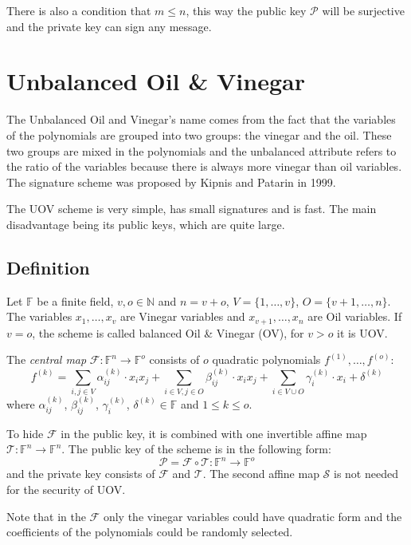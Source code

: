 \documentclass[thesis=M,english]{FITthesis}[2019/12/23]
\begin{document}
There is also a condition that $m \leq n$, this way the public key $\mathcal{P}$ will be surjective and the private key can sign any message.

\section{Unbalanced Oil \& Vinegar}
The Unbalanced Oil and Vinegar's name comes from the fact that the variables of the polynomials are grouped into two groups: the vinegar and the oil. These two groups are mixed in the polynomials and the unbalanced attribute refers to the ratio of the variables because there is always more vinegar than oil variables. The signature scheme was proposed by Kipnis and Patarin in 1999.

\bigskip
\noindent
The UOV scheme is very simple, has small signatures and is fast. The main disadvantage being its public keys, which are quite large.

\subsection{Definition}
Let $\mathbb{F}$ be a finite field, $v,o \in \mathbb{N}$ and $n=v+o$, $V=\{1, \ldots, v\}$, $O=\{v+1, \ldots, n\}$. The variables $x_1, \ldots, x_v$ are Vinegar variables and $x_{v+1}, \ldots, x_n$ are Oil variables. If $v=o$, the scheme is called balanced Oil \& Vinegar (OV), for $v>o$ it is UOV.

\bigskip
\noindent
The \textit{central map} $\mathcal{F}:\mathbb{F}^n \rightarrow \mathbb{F}^o$ consists of $o$ quadratic polynomials $f^{(1)}, \ldots, f^{(o)}$:
\[
f^{(k)} = \sum\limits_{i,j \in V}{\alpha_{ij}^{(k)} \cdot x_ix_j} + \sum\limits_{i \in V,j \in O}{\beta_{ij}^{(k)} \cdot x_ix_j}+ \sum\limits_{i \in V \cup O}{\gamma_{i}^{(k)} \cdot x_i} + \delta^{(k)}
\]
where $\alpha_{ij}^{(k)}$, $\beta_{ij}^{(k)}$, $\gamma_{i}^{(k)}$, $\delta^{(k)} \in \mathbb{F}$ and $1 \leq k \leq o$.

\bigskip
\noindent
To hide $\mathcal{F}$ in the public key, it is combined with one invertible affine map $\mathcal{T}: \mathbb{F}^n \rightarrow \mathbb{F}^n$. The public key of the scheme is in the following form:
\[
\mathcal{P} = \mathcal{F} \circ \mathcal{T} : \mathbb{F}^n \rightarrow \mathbb{F}^o
\]
and the private key consists of $\mathcal{F}$ and $\mathcal{T}$. The second affine map $\mathcal{S}$ is not needed for the security of UOV.

\bigskip
\noindent
Note that in the $\mathcal{F}$ only the vinegar variables could have quadratic form and the coefficients of the polynomials could be randomly selected.
\end{document}
